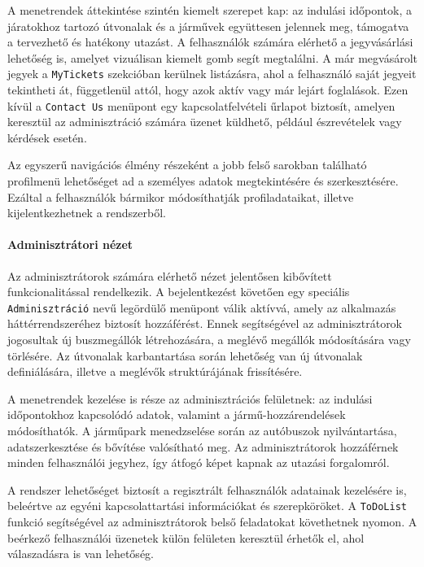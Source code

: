 \indent A menetrendek áttekintése szintén kiemelt szerepet kap: az indulási időpontok, a járatokhoz tartozó útvonalak és a járművek együttesen jelennek meg, támogatva a tervezhető és hatékony utazást. A felhasználók számára elérhető a jegyvásárlási lehetőség is, amelyet vizuálisan kiemelt gomb segít megtalálni. A már megvásárolt jegyek a \texttt{MyTickets} szekcióban kerülnek listázásra, ahol a felhasználó saját jegyeit tekintheti át, függetlenül attól, hogy azok aktív vagy már lejárt foglalások. Ezen kívül a \texttt{Contact Us} menüpont egy kapcsolatfelvételi űrlapot biztosít, amelyen keresztül az adminisztráció számára üzenet küldhető, például észrevételek vagy kérdések esetén.

\indent Az egyszerű navigációs élmény részeként a jobb felső sarokban található profilmenü lehetőséget ad a személyes adatok megtekintésére és szerkesztésére. Ezáltal a felhasználók bármikor módosíthatják profiladataikat, illetve kijelentkezhetnek a rendszerből.

\paragraph{Adminisztrátori nézet}

\indent Az adminisztrátorok számára elérhető nézet jelentősen kibővített funkcionalitással rendelkezik. A bejelentkezést követően egy speciális \texttt{Adminisztráció} nevű legördülő menüpont válik aktívvá, amely az alkalmazás háttérrendszeréhez biztosít hozzáférést. Ennek segítségével az adminisztrátorok jogosultak új buszmegállók létrehozására, a meglévő megállók módosítására vagy törlésére. Az útvonalak karbantartása során lehetőség van új útvonalak definiálására, illetve a meglévők struktúrájának frissítésére.

\indent A menetrendek kezelése is része az adminisztrációs felületnek: az indulási időpontokhoz kapcsolódó adatok, valamint a jármű-hozzárendelések módosíthatók. A járműpark menedzselése során az autóbuszok nyilvántartása, adatszerkesztése és bővítése valósítható meg. Az adminisztrátorok hozzáférnek minden felhasználói jegyhez, így átfogó képet kapnak az utazási forgalomról.

\indent A rendszer lehetőséget biztosít a regisztrált felhasználók adatainak kezelésére is, beleértve az egyéni kapcsolattartási információkat és szerepköröket. A \texttt{ToDoList} funkció segítségével az adminisztrátorok belső feladatokat követhetnek nyomon. A beérkező felhasználói üzenetek külön felületen keresztül érhetők el, ahol válaszadásra is van lehetőség.

